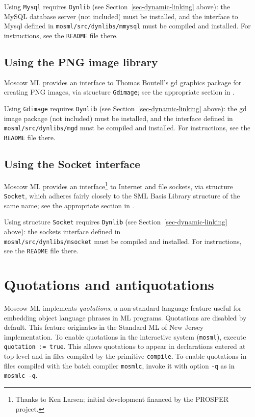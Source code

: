 \documentclass[fleqn,a4paper]{article}
\begin{document}
Using \texttt{Mysql} requires {\tt Dynlib} (see
Section~\ref{sec-dynamic-linking} above): the MySQL database server (not
included) must be installed, and the interface to Mysql defined in
{\tt mosml/src/dynlibs/mmysql} must be compiled and installed.  For
instructions, see the {\tt README} file there.


\subsection{Using the PNG image library}
\label{sec-using-mgd}

Moscow ML provides an interface to Thomas Boutell's gd graphics
package for creating PNG images, via structure {\tt Gdimage}; see the
appropriate section in \cite{MoscowML:2000:MoscowMLLibrary}.

Using \texttt{Gdimage} requires {\tt Dynlib} (see
Section~\ref{sec-dynamic-linking} above): the gd image package (not
included) must be installed, and the interface defined in {\tt
  mosml/src/dynlibs/mgd} must be compiled and installed.  For
instructions, see the {\tt README} file there.


\subsection{Using the Socket interface}
\label{sec-using-msocket}

Moscow ML provides an interface\footnote{Thanks to Ken Larsen; initial
  development financed by the PROSPER project.} to Internet and file
sockets, via structure {\tt Socket}, which adheres fairly closely to
the SML Basis Library structure of the same name; see the
appropriate section in \cite{MoscowML:2000:MoscowMLLibrary}.

Using structure {\tt Socket} requires {\tt Dynlib} (see
Section~\ref{sec-dynamic-linking} above): the sockets interface defined in\\
{\tt mosml/src/dynlibs/msocket} must be compiled and installed.  For
instructions, see the {\tt README} file there.

\newpage
\section{Quotations and antiquotations}
\label{sec-quotations}

Moscow ML implements {\em quotations\/}, a non-standard language
feature useful for embedding object language phrases in ML programs.
Quotations are disabled by default.  This feature originates in the
Standard ML of New Jersey implementation.  To enable quotations in the
interactive system ({\tt mosml}), execute {\tt quotation := true}.
This allows quotations to appear in declarations entered at top-level
and in files compiled by the primitive {\tt compile}.  To enable
quotations in files compiled with the batch compiler {\tt mosmlc},
invoke it with option {\tt -q} as in {\tt mosmlc -q}.
\end{document}
